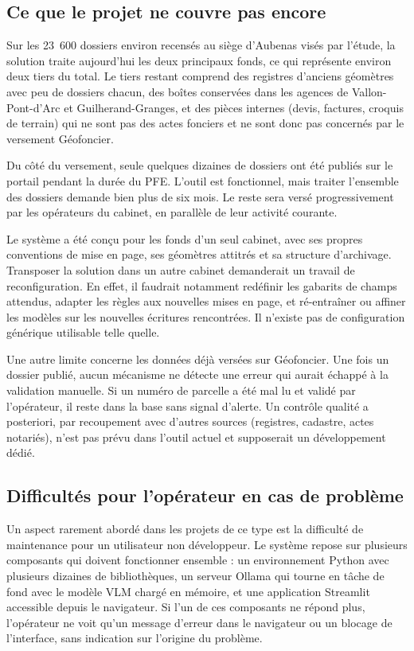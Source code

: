 \subsection{Ce que le projet ne couvre pas encore}

Sur les 23~600 dossiers environ recensés au siège d'Aubenas visés par l'étude, la solution traite aujourd'hui les deux principaux fonds, ce qui représente environ deux tiers du total. Le tiers restant comprend des registres d'anciens géomètres avec peu de dossiers chacun, des boîtes conservées dans les agences de Vallon-Pont-d'Arc et Guilherand-Granges, et des pièces internes (devis, factures, croquis de terrain) qui ne sont pas des actes fonciers et ne sont donc pas concernés par le versement Géofoncier.

Du côté du versement, seule quelques dizaines de dossiers ont été publiés sur le portail pendant la durée du PFE. L'outil est fonctionnel, mais traiter l'ensemble des dossiers demande bien plus de six mois. Le reste sera versé progressivement par les opérateurs du cabinet, en parallèle de leur activité courante.

Le système a été conçu pour les fonds d'un seul cabinet, avec ses propres conventions de mise en page, ses géomètres attitrés et sa structure d'archivage. Transposer la solution dans un autre cabinet demanderait un travail de reconfiguration. En effet, il faudrait notamment redéfinir les gabarits de champs attendus, adapter les règles aux nouvelles mises en page, et ré-entraîner ou affiner les modèles sur les nouvelles écritures rencontrées. Il n'existe pas de configuration générique utilisable telle quelle.

Une autre limite concerne les données déjà versées sur Géofoncier. Une fois un dossier publié, aucun mécanisme ne détecte une erreur qui aurait échappé à la validation manuelle. Si un numéro de parcelle a été mal lu et validé par l'opérateur, il reste dans la base sans signal d'alerte. Un contrôle qualité a posteriori, par recoupement avec d'autres sources (registres, cadastre, actes notariés), n'est pas prévu dans l'outil actuel et supposerait un développement dédié.




\subsection{Difficultés pour l'opérateur en cas de problème}

Un aspect rarement abordé dans les projets de ce type est la difficulté de maintenance pour un utilisateur non développeur. Le système repose sur plusieurs composants qui doivent fonctionner ensemble : un environnement Python avec plusieurs dizaines de bibliothèques, un serveur Ollama qui tourne en tâche de fond avec le modèle VLM chargé en mémoire, et une application Streamlit accessible depuis le navigateur. Si l'un de ces composants ne répond plus, l'opérateur ne voit qu'un message d'erreur dans le navigateur ou un blocage de l'interface, sans indication sur l'origine du problème.

